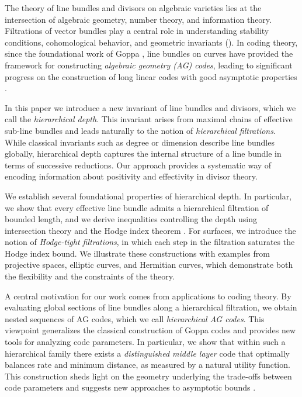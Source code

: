 \documentclass[14pt]{amsart}
\theoremstyle{plain}
\theoremstyle{definition}
\theoremstyle{remark}
\theoremstyle{example}
\begin{document}
The theory of line bundles and divisors on algebraic varieties lies at the 
intersection of algebraic geometry, number theory, and information theory. 
Filtrations of vector bundles play a central role in understanding 
stability conditions, cohomological behavior, and geometric invariants (\cite{HaNa,AtBo}). 
In coding theory, since the foundational work of Goppa \cite{Go}, 
line bundles on curves have provided the framework for constructing 
\emph{algebraic geometry (AG) codes}, leading to significant progress 
on the construction of long linear codes with good asymptotic properties 
\cite{St,TsVlZi}. 

In this paper we introduce a new invariant of line bundles and divisors, 
which we call the \emph{hierarchical depth}. This invariant arises from 
maximal chains of effective sub-line bundles and leads naturally to the 
notion of \emph{hierarchical filtrations}. While classical invariants such 
as degree or dimension describe line bundles globally, hierarchical depth 
captures the internal structure of a line bundle in terms of successive 
reductions. Our approach provides a systematic way of encoding information 
about positivity and effectivity in divisor theory. 

We establish several foundational properties of hierarchical depth. 
In particular, we show that every effective line bundle admits a hierarchical 
filtration of bounded length, and we derive inequalities controlling the depth 
using intersection theory and the Hodge index theorem \cite{Ha,Be}. 
For surfaces, we introduce the notion of \emph{Hodge-tight filtrations}, in 
which each step in the filtration saturates the Hodge index bound. We illustrate 
these constructions with examples from projective spaces, elliptic curves, and 
Hermitian curves, which demonstrate both the flexibility and the constraints 
of the theory. 

A central motivation for our work comes from applications to coding theory. 
By evaluating global sections of line bundles along a hierarchical filtration, 
we obtain nested sequences of AG codes, which we call \emph{hierarchical AG codes}. 
This viewpoint generalizes the classical construction of Goppa codes and provides 
new tools for analyzing code parameters. In particular, we show that within such 
a hierarchical family there exists a \emph{distinguished middle layer} code that 
optimally balances rate and minimum distance, as measured by a natural utility 
function. This construction sheds light on the geometry underlying the trade-offs 
between code parameters and suggests new approaches to asymptotic bounds 
\cite{TsVlZi,St}. 
\end{document}
